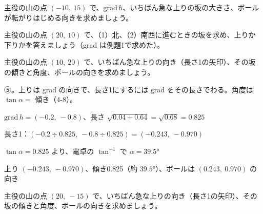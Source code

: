 \begingroup{}%
\noindent\begin{minipage}[t]{0.485\linewidth}\vspace{0pt}
\begin{jibun}
\raggedright 主役の山の点 $(-10,\ 15)$ で、$\mathrm{grad}\,h$、いちばん急な上りの坂の大きさ、ボールが転がりはじめる向きを求めましょう。
\end{jibun}
\end{minipage}\hfill
\begin{minipage}[t]{0.485\linewidth}\vspace{0pt}
\begin{jibun}
\raggedright 主役の山の点 $(20,\ 10)$ で、（1）北、（2）南西に進むときの坂を求め、上りか下りかを答えましょう（grad は例題1で求めた）。
\end{jibun}
\end{minipage}\par
\endgroup

\begin{reidai}[いちばん急な上りと坂の角度]
主役の山の点 $(10,\ 20)$ で、いちばん急な上りの向き（長さ1の矢印）、その坂の傾きと角度、ボールの向きを求めましょう。\par
\kangaekata ⑤。上りは grad の向きで、長さ1にするには grad をその長さでわる。角度は $\tan\alpha=$ 傾き（4-8）。\par
\shiki\kviiies{}\zw{} $\mathrm{grad}\,h=(-0.2,\ -0.8)$、長さ $\sqrt{0.04+0.64}=\sqrt{0.68}=0.825$\par
\kviiiea 長さ1：$(-0.2\div0.825,\ -0.8\div0.825)=(-0.243,\ -0.970)$\par
\kviiiea $\tan\alpha=0.825$ より、電卓の $\tan^{-1}$ で $\alpha=39.5°$\par
\kotae\kviiies{}\zw{} 上り $(-0.243,\ -0.970)$、傾き0.825（約 $39.5°$）、ボールは $(0.243,\ 0.970)$ の向き
\end{reidai}

\begin{jibun}
主役の山の点 $(20,\ -15)$ で、いちばん急な上りの向き（長さ1の矢印）、その坂の傾きと角度、ボールの向きを求めましょう。
\end{jibun}

